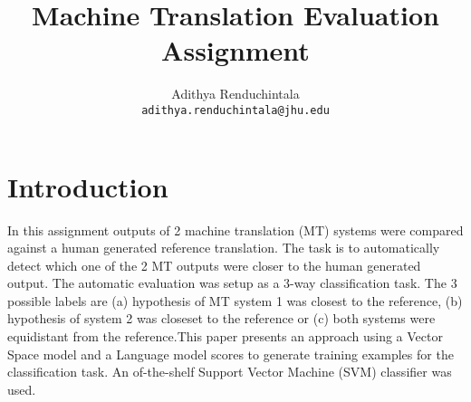\documentclass[11pt]{article}
\title{Machine Translation Evaluation Assignment}
\author{Adithya Renduchintala \\
  {\tt adithya.renduchintala@jhu.edu}\\
  }
\date{}
\begin{document}
\maketitle


\section{Introduction}

In this assignment  outputs of 2 machine translation (MT)
systems were compared against a human generated reference translation. The task
is to automatically detect which one of the 2 MT outputs were closer to the
human generated output. The automatic evaluation was setup as a 3-way
classification task. The 3 possible labels are (a) hypothesis of MT system 1
was closest to the reference, (b) hypothesis of system 2 was closeset to the
reference or (c) both systems were equidistant from the reference.This paper
presents an approach using a Vector Space model and a Language model scores to 
generate training examples for the classification task. An of-the-shelf Support 
Vector Machine (SVM) classifier was used.
\end{document}
